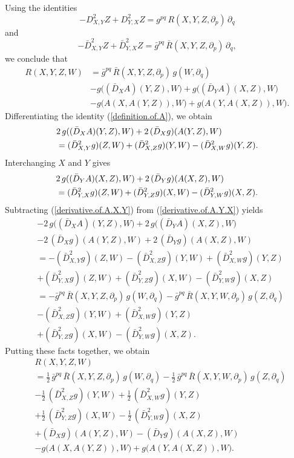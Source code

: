 \documentclass[11pt]{amsart}
\theoremstyle{definition}
\begin{document}
Using the identities 
\[-D_{X,Y}^2 Z + D_{Y,X}^2 Z = g^{pq} \, R(X,Y,Z,\partial_p) \, \partial_q\] 
and 
\[-\bar{D}_{X,Y}^2 Z + \bar{D}_{Y,X}^2 Z = \bar{g}^{pq} \, \bar{R}(X,Y,Z,\partial_p) \, \partial_q,\] 
we conclude that 
\begin{align*} 
R(X,Y,Z,W) 
&= \bar{g}^{pq} \, \bar{R}(X,Y,Z,\partial_p) \, g(W,\partial_q) \\ 
&- g \big ( (\bar{D}_X A)(Y,Z),W \big ) + g \big ( (\bar{D}_Y A)(X,Z),W \big ) \\ 
&- g \big ( A(X,A(Y,Z)),W \big ) + g \big ( A(Y,A(X,Z)),W \big ). 
\end{align*}
Differentiating the identity (\ref{definition.of.A}), we obtain 
\begin{align} 
\label{derivative.of.A.X.Y}
&2 \, g((\bar{D}_X A)(Y,Z),W) + 2 \, (\bar{D}_X g)(A(Y,Z),W) \notag \\ 
&= (\bar{D}_{X,Y}^2 g)(Z,W) + (\bar{D}_{X,Z}^2 g)(Y,W) - (\bar{D}_{X,W}^2 g)(Y,Z). 
\end{align}
Interchanging $X$ and $Y$ gives
\begin{align}
\label{derivative.of.A.Y.X}
&2 \, g((\bar{D}_Y A)(X,Z),W) + 2 \, (\bar{D}_Y g)(A(X,Z),W) \notag \\ 
&= (\bar{D}_{Y,X}^2 g)(Z,W) + (\bar{D}_{Y,Z}^2 g)(X,W) - (\bar{D}_{Y,W}^2 g)(X,Z). 
\end{align}
Subtracting (\ref{derivative.of.A.X.Y}) from (\ref{derivative.of.A.Y.X}) yields 
\begin{align*} 
&-2 \, g \big ( (\bar{D}_X A)(Y,Z),W \big ) + 2 \, g \big ( (\bar{D}_Y A)(X,Z),W \big ) \\ 
&- 2 \, (\bar{D}_X g)(A(Y,Z),W) + 2 \, (\bar{D}_Y g)(A(X,Z),W) \\ 
&= -(\bar{D}_{X,Y}^2 g)(Z,W) - (\bar{D}_{X,Z}^2 g)(Y,W) + (\bar{D}_{X,W}^2 g)(Y,Z) \\ 
&+ (\bar{D}_{Y,X}^2 g)(Z,W) + (\bar{D}_{Y,Z}^2 g)(X,W) - (\bar{D}_{Y,W}^2 g)(X,Z) \\ 
&= -\bar{g}^{pq} \, \bar{R}(X,Y,Z,\partial_p) \, g(W,\partial_q) - \bar{g}^{pq} \, \bar{R}(X,Y,W,\partial_p) \, g(Z,\partial_q) \\ 
&- (\bar{D}_{X,Z}^2 g)(Y,W) + (\bar{D}_{X,W}^2 g)(Y,Z) \\ 
&+ (\bar{D}_{Y,Z}^2 g)(X,W) - (\bar{D}_{Y,W}^2 g)(X,Z). 
\end{align*}
Putting these facts together, we obtain 
\begin{align*} 
&R(X,Y,Z,W) \\ 
&= \frac{1}{2} \, \bar{g}^{pq} \, \bar{R}(X,Y,Z,\partial_p) \, g(W,\partial_q) - \frac{1}{2} \, \bar{g}^{pq} \, \bar{R}(X,Y,W,\partial_p) \, g(Z,\partial_q) \\ 
&- \frac{1}{2} \, (\bar{D}_{X,Z}^2 g)(Y,W) + \frac{1}{2} \, (\bar{D}_{X,W}^2 g)(Y,Z) \\ 
&+ \frac{1}{2} \, (\bar{D}_{Y,Z}^2 g)(X,W) - \frac{1}{2} \, (\bar{D}_{Y,W}^2 g)(X,Z) \\ 
&+ (\bar{D}_X g)(A(Y,Z),W) - (\bar{D}_Y g)(A(X,Z),W) \\ 
&- g \big ( A(X,A(Y,Z)),W \big ) + g \big ( A(Y,A(X,Z)),W \big ). 
\end{align*}
\end{document}
